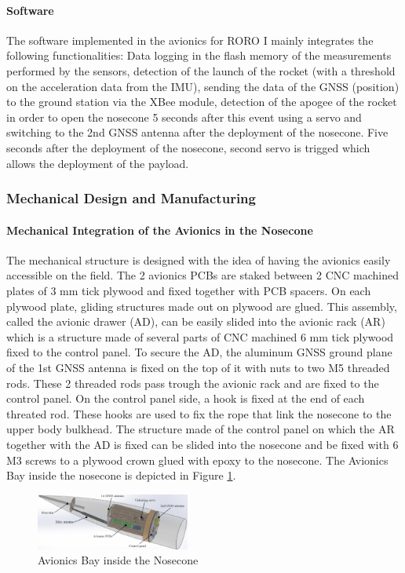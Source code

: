 \paragraph{Software}
 \hfill \break
The software implemented in the avionics for RORO I mainly integrates the following functionalities: Data logging in the flash memory of the measurements performed by the sensors, detection of the launch of the rocket (with a threshold on the acceleration data from the IMU), sending the data of the GNSS (position) to the ground station via the XBee module, detection of the apogee of the rocket in order to open the nosecone 5 seconds after this event using a servo and switching to the 2nd GNSS antenna after the deployment of the nosecone. Five seconds after the deployment of the nosecone, second servo is trigged which allows the deployment of the payload.

\subsubsection{Mechanical Design and Manufacturing}
\paragraph{Mechanical Integration of the Avionics in the Nosecone}
 \hfill \break
The mechanical structure is designed with the idea of having the avionics easily accessible on the field. The 2 avionics PCBs are staked between 2 CNC machined plates of 3 mm tick plywood and fixed together with PCB spacers. On each plywood plate, gliding structures made out on plywood are glued. This assembly, called the avionic drawer (AD), can be easily slided into the avionic rack (AR) which is a structure made of several parts of CNC machined 6 mm tick plywood fixed to the control panel. To secure the AD, the aluminum GNSS ground plane of the 1st GNSS antenna is fixed on the top of it with nuts to two M5 threaded rods. These 2 threaded rods pass trough the avionic rack and are fixed to the control panel. On the control panel side, a hook is fixed at the end of each threated rod. These hooks are used to fix the rope that link the nosecone to the upper body bulkhead. The structure made of the control panel on which the AR together with the AD is fixed can be slided into the nosecone and be fixed with 6 M3 screws to a plywood crown glued with epoxy to the nosecone. The Avionics Bay inside the nosecone is depicted in Figure \ref{f:avionics_bay}.

  \begin{figure}[h!]
 	\centering
        \includegraphics[width=0.45\textwidth]{img/AV_FIG_CAD_nosecone.jpg}
        \caption{Avionics Bay inside the Nosecone}
        \label{f:avionics_bay}
 \end{figure}

